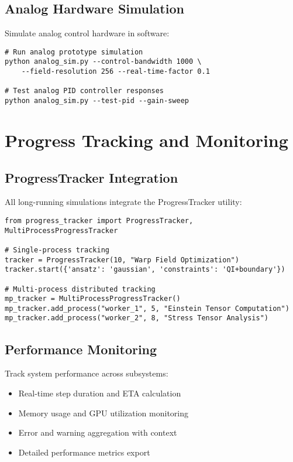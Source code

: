 \documentclass{article}
\begin{document}
\subsection{Analog Hardware Simulation}

Simulate analog control hardware in software:

\begin{lstlisting}
# Run analog prototype simulation
python analog_sim.py --control-bandwidth 1000 \
    --field-resolution 256 --real-time-factor 0.1

# Test analog PID controller responses
python analog_sim.py --test-pid --gain-sweep
\end{lstlisting}

\section{Progress Tracking and Monitoring}

\subsection{ProgressTracker Integration}

All long-running simulations integrate the ProgressTracker utility:

\begin{lstlisting}
from progress_tracker import ProgressTracker, MultiProcessProgressTracker

# Single-process tracking
tracker = ProgressTracker(10, "Warp Field Optimization")
tracker.start({'ansatz': 'gaussian', 'constraints': 'QI+boundary'})

# Multi-process distributed tracking
mp_tracker = MultiProcessProgressTracker()
mp_tracker.add_process("worker_1", 5, "Einstein Tensor Computation")
mp_tracker.add_process("worker_2", 8, "Stress Tensor Analysis")
\end{lstlisting}

\subsection{Performance Monitoring}

Track system performance across subsystems:

\begin{itemize}
\item Real-time step duration and ETA calculation
\item Memory usage and GPU utilization monitoring
\item Error and warning aggregation with context
\item Detailed performance metrics export
\end{itemize}
\end{document}
